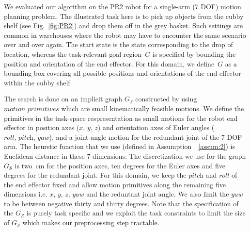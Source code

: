 \documentclass[letterpaper]{article} %
\newcommand{\calS}{\ensuremath{\mathcal{S}}\xspace}
\begin{document}
We evaluated our algorithm on the PR2 robot for a single-arm (7 DOF) motion planning problem. The illustrated task here is to pick up objects from the cubby shelf (see Fig.~\ref{fig:PR2}) and drop them off in the grey basket. Such settings are common in warehouses where the robot may have to encounter the same scenario over and over again. The start state is the state corresponding to the drop of location, whereas the task-relevant goal region~$G$ is specified by bounding the position and orientation of the end effector. For this domain, we define~$G$ as a bounding box covering all possible positions and orientations of the end effector within the cubby shelf.

The search is done on an implicit graph $G_\calS$ constructed by using $\textit{motion primitives}$ which are small kinematically feasible motions. We define the primitives in the task-space respresentation as small motions for the robot end effector in position axes ($\textit{x, y, z}$) and orientation axes of Euler angles ($\textit{roll, pitch, yaw}$), and a joint-angle motion for the redundant joint of the 7 DOF arm. The heurstic function that we use (defined in Assumption~~\ref{assum:2}) is Euclidean distance in these 7 dimensions. The discretization we use for the graph $G_\calS$ is two~cm for the position axes, ten degrees for the Euler axes and five degrees for the redundant joint. 
For this domain, we keep the $\textit{pitch}$ and $\textit{roll}$ of the end effector fixed and allow motion primitives along the remaining five dimensions i.e. $\textit{x, y, z, yaw}$ and the reduntant joint angle. We also limit the $\textit{yaw}$ to be between negative thirty and thirty degrees. Note that the specification of the $G_\calS$ is purely task specific and we exploit the task constraints to limit the size of $G_\calS$ which makes our preprocessing step tractable.
\end{document}
